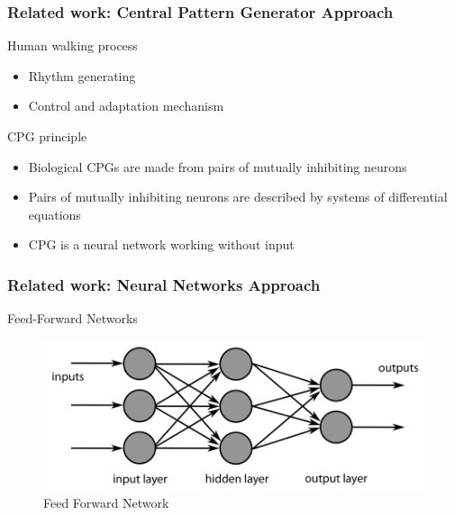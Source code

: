 \documentclass{beamer}
\begin{document}

	\begin{frame}
		\frametitle{Related work: Central Pattern Generator Approach}
		\begin{block}{Human walking process}
			\begin{itemize}
				\item
					Rhythm generating
				\item
					Control and adaptation mechanism
					
			\end{itemize}
		\end{block}
		\begin{block}{CPG principle}
			\begin{itemize}
				\item
					Biological CPGs are made from pairs of mutually inhibiting neurons
				\item
					Pairs of mutually inhibiting neurons are described by systems of differential equations
				\item
					CPG is a neural network working without input
			\end{itemize}
		\end{block}
	\end{frame}


	\begin{frame}
		\frametitle{Related work: Neural Networks Approach}
		\centering
		Feed-Forward Networks
		
		\begin{figure}[h!]
			\begin{minipage}[H]{\linewidth}
				\centering
				\includegraphics[width=\linewidth]{presentation_images/9}
				\caption{Feed Forward Network \cite{kim2012zmp}}
			\end{minipage}
		\end{figure}
	\end{frame}
\end{document}
